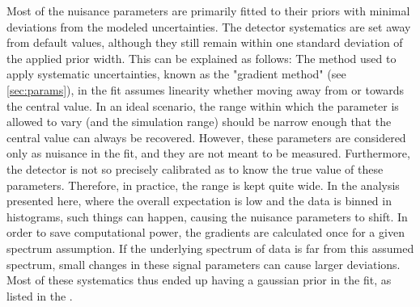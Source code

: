 Most of the nuisance parameters are primarily fitted to their priors with minimal deviations from the modeled uncertainties. The detector systematics are set away from default values, although they still remain within one standard deviation of the applied prior width. This can be explained as follows: The method used to apply systematic uncertainties, known as the "gradient method" (see \ref{sec:params}), in the fit assumes linearity whether moving away from or towards the central value. In an ideal scenario, the range within which the parameter is allowed to vary (and the simulation range) should be narrow enough that the central value can always be recovered. However, these parameters are considered only as nuisance in the fit, and they are not meant to be measured. Furthermore, the detector is not so precisely calibrated as to know the true value of these parameters. Therefore, in practice, the range is kept quite wide. In the analysis presented here, where the overall expectation is low and the data is binned in histograms, such things can happen, causing the nuisance parameters to shift.  In order to save computational power, the gradients are calculated once for a given spectrum assumption. If the underlying spectrum of data is far from this assumed spectrum, small changes in these signal parameters can cause larger deviations. Most of these systematics thus ended up having a gaussian prior in the fit, as listed in the . 
 
